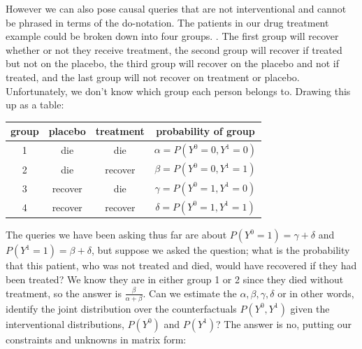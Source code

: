\documentclass[11pt,a4paper,oneside]{book}
\begin{document}
However we can also pose causal queries that are not interventional and cannot be phrased in terms of the do-notation. The patients in our drug treatment example could be broken down into four groups. . The first group will recover whether or not they receive treatment, the second group will recover if treated but not on the placebo, the third group will recover on the placebo and not if treated, and the last group will not recover on treatment or placebo. Unfortunately, we don't know which group each person belongs to. Drawing this up as a table:

\begin{tabular}{c|c|c|c}
group & placebo & treatment & probability of group\\
\hline
1 & die & die & $\alpha=P(Y^{0}=0,Y^{1}=0)$\\
2 & die & recover & $\beta=P(Y^{0}=0,Y^{1}=1)$\\
3 & recover & die & $\gamma=P(Y^{0}=1,Y^{1}=0)$\\
4 & recover & recover & $\delta=P(Y^{0}=1,Y^{1}=1)$\\
\end{tabular}

The queries we have been asking thus far are about $P(Y^{0}=1) = \gamma + \delta$ and $P(Y^{1}=1) = \beta + \delta$, but suppose we asked the question; what is the probability that this patient, who was not treated and died, would have recovered if they had been treated? We know they are in either group 1 or 2 since they died without treatment, so the answer is $\frac{\beta}{\alpha+\beta}$. Can we estimate the $\alpha, \beta, \gamma, \delta$ or in other words, identify the joint distribution over the counterfactuals $P(Y^{0},Y^{1})$ given the interventional distributions, $P(Y^{0})$ and $P(Y^{1})$? The answer is no, putting our constraints and unknowns in matrix form:
\end{document}
